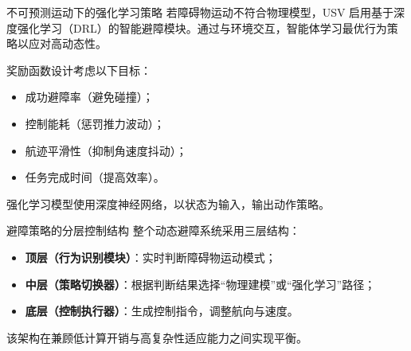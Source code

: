 \begin{frame}{不可预测运动下的强化学习策略}
\justifying
若障碍物运动不符合物理模型，USV 启用基于深度强化学习（DRL）的智能避障模块。通过与环境交互，智能体学习最优行为策略以应对高动态性。

奖励函数设计考虑以下目标：
\begin{itemize}
    \item 成功避障率（避免碰撞）；
    \item 控制能耗（惩罚推力波动）；
    \item 航迹平滑性（抑制角速度抖动）；
    \item 任务完成时间（提高效率）。
\end{itemize}
强化学习模型使用深度神经网络，以状态为输入，输出动作策略。
\end{frame}

\begin{frame}{避障策略的分层控制结构}
\justifying
整个动态避障系统采用三层结构：
\begin{itemize}
    \item \textbf{顶层（行为识别模块）}：实时判断障碍物运动模式；
    \item \textbf{中层（策略切换器）}：根据判断结果选择“物理建模”或“强化学习”路径；
    \item \textbf{底层（控制执行器）}：生成控制指令，调整航向与速度。
\end{itemize}
该架构在兼顾低计算开销与高复杂性适应能力之间实现平衡。
\end{frame}


